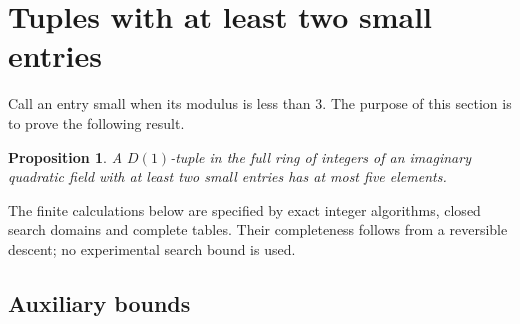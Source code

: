 \documentclass[12pt]{article}
\newtheorem{proposition}[theorem]{Proposition}
\numberwithin{equation}{section}
\begin{document}
\section{Tuples with at least two small entries}\label{sec:small-entries}
Call an entry small when its modulus is less than $3$.
The purpose of this section is to prove the following result.
\begin{proposition}\label{sm:main}
A $D(1)$-tuple in the full ring of integers of an imaginary quadratic
field with at least two small entries has at most five elements.
\end{proposition}
The finite calculations below are specified by exact integer algorithms,
closed search domains and complete tables. Their completeness follows
from a reversible descent; no experimental search bound is used.

\subsection{Auxiliary bounds}
\end{document}
